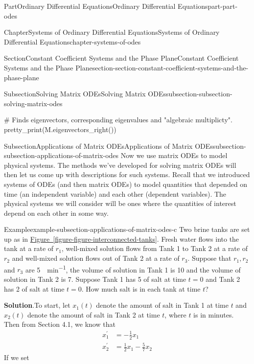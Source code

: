 \documentclass[twoside,10pt,]{book}
\newcommand{\blocktitlefont}{\relax}
\newcommand{\xreffont}{\relax}
\numberwithin{equation}{part}
\begin{document}
\begin{partptx}{Part}{Ordinary Differential Equations}{}{Ordinary Differential Equations}{}{}{part-part-odes}
\begin{chapterptx}{Chapter}{Systems of Ordinary Differential Equations}{}{Systems of Ordinary Differential Equations}{}{}{chapter-systems-of-odes}
\begin{sectionptx}{Section}{Constant Coefficient Systems and the Phase Plane}{}{Constant Coefficient Systems and the Phase Plane}{}{}{section-section-constant-coefficient-systems-and-the-phase-plane}
\begin{subsectionptx}{Subsection}{Solving Matrix ODEs}{}{Solving Matrix ODEs}{}{}{subsection-subsection-solving-matrix-odes}
\begin{sageinput}
# Finds eigenvectors, corresponding eigenvalues and "algebraic multiplicty".
pretty_print(M.eigenvectors_right())
\end{sageinput}
\end{subsectionptx}
%
%
\typeout{************************************************}
\typeout{************************************************}
%
\begin{subsectionptx}{Subsection}{Applications of Matrix ODEs}{}{Applications of Matrix ODEs}{}{}{subsection-subsection-applications-of-matrix-odes}
Now we use matrix ODEs to model physical systems. The methods we've developed for solving matrix ODEs will then let us come up with descriptions for such systems. Recall that we introduced systems of ODEs (and then matrix ODEs) to model quantities that depended on time (an independent variable) and each other (dependent variables). The physical systems we will consider will be ones where the quantities of interest depend on each other in some way.%
\begin{example}{Example}{}{example-subsection-applications-of-matrix-odes-c}%
Two brine tanks are set up as in \hyperref[figure-figure-interconnected-tanks]{Figure~{\xreffont\ref{figure-figure-interconnected-tanks}}}. Fresh water flows into the tank at a rate of \(r_{1}\), well-mixed solution flows from Tank 1 to Tank 2 at a rate of \(r_{2}\) and well-mixed solution flows out of Tank 2 at a rate of \(r_{3}\). Suppose that \(r_{1}, r_{2}\) and  \(r_{3}\) are \SI{5}{\gallon\per\minute}, the volume of solution in Tank 1 is \SI{10}{\gallon} and the volume of solution in Tank 2 is \SI{7}{\gallon}. Suppose Tank 1 has \SI{5}{\pound} of salt at time \(t=0\) and Tank 2 has \SI{2}{\pound} of salt at time \(t=0\). How much salt is in each tank at time \(t\)?%
\par\smallskip%
\noindent\textbf{\blocktitlefont Solution}.\hypertarget{solution-subsection-applications-of-matrix-odes-c-b}{}\quad{}To start, let \(x_{1}(t)\) denote the amount of salt in Tank 1 at time \(t\) and \(x_{2}(t)\) denote the amount of salt in Tank 2 at time \(t\), where \(t\) is in minutes. Then from Section 4.1, we know that%
\begin{align*}
x^\prime_{1} & = -\frac{1}{2}x_{1}\\
x^\prime_{2} & = \frac{1}{2}x_{1}-\frac{5}{7}x_{2}
\end{align*}
If we set%
\begin{equation*}

\end{equation*}
\end{example}
\end{subsectionptx}
\end{sectionptx}
\end{chapterptx}
\end{partptx}
\end{document}
